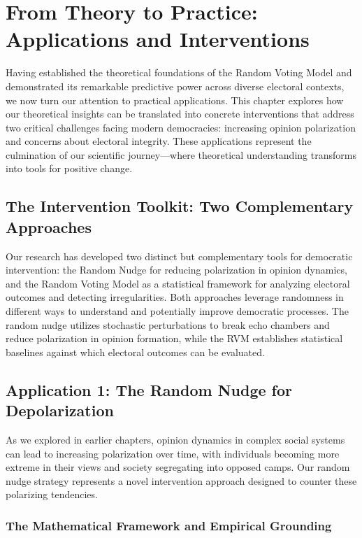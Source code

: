 \chapter{From Theory to Practice: Applications and Interventions}
\label{chap7}

Having established the theoretical foundations of the Random Voting Model and demonstrated its remarkable predictive power across diverse electoral contexts, we now turn our attention to practical applications. This chapter explores how our theoretical insights can be translated into concrete interventions that address two critical challenges facing modern democracies: increasing opinion polarization and concerns about electoral integrity. These applications represent the culmination of our scientific journey—where theoretical understanding transforms into tools for positive change.

\section{The Intervention Toolkit: Two Complementary Approaches}

Our research has developed two distinct but complementary tools for democratic intervention: the Random Nudge for reducing polarization in opinion dynamics, and the Random Voting Model as a statistical framework for analyzing electoral outcomes and detecting irregularities. Both approaches leverage randomness in different ways to understand and potentially improve democratic processes. The random nudge utilizes stochastic perturbations to break echo chambers and reduce polarization in opinion formation, while the RVM establishes statistical baselines against which electoral outcomes can be evaluated.

\section{Application 1: The Random Nudge for Depolarization}

As we explored in earlier chapters, opinion dynamics in complex social systems can lead to increasing polarization over time, with individuals becoming more extreme in their views and society segregating into opposed camps. Our random nudge strategy represents a novel intervention approach designed to counter these polarizing tendencies.

\subsection{The Mathematical Framework and Empirical Grounding}

